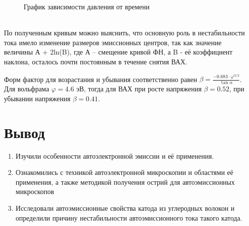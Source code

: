 \documentclass[a4paper, 12pt]{article}
\begin{document}
\begin{enumerate}
\begin{figure}[!htb]
			\caption{График зависимости давления от времени}
		\end{figure}\\
		По полученным кривым можно выяснить, что основную роль в нестабильности тока имело изменение размеров эмиссионных центров, так как значение величины А + 2ln(B), где А – смещение кривой ФН, а B - её коэффициент наклона, осталось почти постоянным в  течение снятия ВАХ.\par
		Форм фактор для возрастания и убывания соответственно равен $\beta=\frac{-0.683\cdot\varphi^{3/2}}{\tan\alpha}$.
		Для вольфрама $\varphi=4.6$ эВ, тогда для ВАХ при росте напряжения $\beta=0.52$, при убывании напряжения $\beta=0.41$.\par
	\end{enumerate}
	\newpage
	\section{Вывод}
	\begin{enumerate}
		\item Изучили особенности автоэлектронной эмиссии и её применения.
		\item Ознакомились с техникой автоэлектронной микроскопии и областями её применения, а также методикой получения острий для автоэмиссионных микроскопов
		\item Исследовали автоэмиссионные свойства катода из углеродных волокон и определили причину нестабильности автоэмиссионного тока такого катода.
	\end{enumerate}
\end{document}
